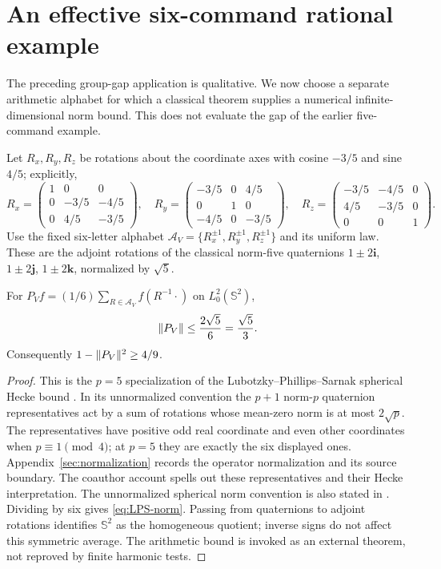 \section{An effective six-command rational example}\label{sec:effective}
The preceding group-gap application is qualitative. We now choose a
separate arithmetic alphabet for which a classical theorem supplies a
numerical infinite-dimensional norm bound. This does not evaluate the
gap of the earlier five-command example.

Let $R_x,R_y,R_z$ be rotations about the coordinate axes with cosine
$-3/5$ and sine $4/5$; explicitly,
\begin{equation}\label{eq:six-gates}
 R_x=\begin{pmatrix}1&0&0\\0&-3/5&-4/5\\0&4/5&-3/5\end{pmatrix},\quad
 R_y=\begin{pmatrix}-3/5&0&4/5\\0&1&0\\-4/5&0&-3/5\end{pmatrix},\quad
 R_z=\begin{pmatrix}-3/5&-4/5&0\\4/5&-3/5&0\\0&0&1\end{pmatrix}.
\end{equation}
Use the fixed six-letter alphabet
$\mathcal A_V=\{R_x^{\pm1},R_y^{\pm1},R_z^{\pm1}\}$ and its uniform
law. These are the adjoint rotations of the classical norm-five
quaternions $1\pm2\mathbf i$, $1\pm2\mathbf j$, $1\pm2\mathbf k$,
normalized by $\sqrt5$.

\begin{proposition}\label{prop:LPS}
For $P_Vf=(1/6)\sum_{R\in\mathcal A_V}f(R^{-1}\cdot)$ on
$L^2_0(\mathbb S^2)$,
\begin{equation}\label{eq:LPS-norm}
                 \lVert P_V\rVert\le\frac{2\sqrt5}{6}=\frac{\sqrt5}{3}.
\end{equation}
Consequently $1-\lVert P_V\rVert^2\ge4/9$.
\end{proposition}
\begin{proof}
This is the $p=5$ specialization of the Lubotzky--Phillips--Sarnak
spherical Hecke bound \cite{LPS86,LPS87}. In its unnormalized convention
the $p+1$ norm-$p$ quaternion representatives act by a sum of rotations
whose mean-zero norm is at most $2\sqrt p$. The representatives have
positive odd real coordinate and even other coordinates when
$p\equiv1\pmod4$; at $p=5$ they are exactly the six displayed ones.
Appendix~\ref{sec:normalization} records the operator normalization and its source boundary. The coauthor account \cite[Section 3.2, the $V$-gate example]{PS}
spells out these representatives and their Hecke interpretation.
The unnormalized spherical norm convention is also stated in
\cite[Theorem 3(ii)]{Pisier}. Dividing by six gives
\eqref{eq:LPS-norm}. Passing from quaternions to adjoint rotations
identifies $\mathbb S^2$ as the homogeneous quotient; inverse signs do
not affect this symmetric average. The arithmetic bound is invoked as
an external theorem, not reproved by finite harmonic tests.
\end{proof}

